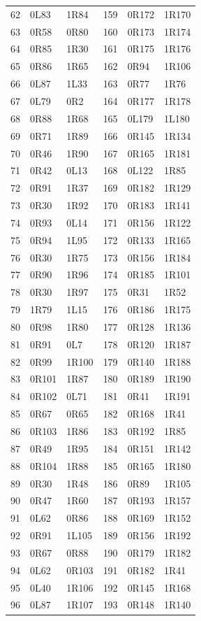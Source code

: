 \begin{longtable}{rll@{\hspace{10mm}}rll}
62 & 0L83 & 1R84 & 159 & 0R172 & 1R170\\
63 & 0R58 & 0R80 & 160 & 0R173 & 1R174\\
64 & 0R85 & 1R30 & 161 & 0R175 & 1R176\\
65 & 0R86 & 1R65 & 162 & 0R94 & 1R106\\
66 & 0L87 & 1L33 & 163 & 0R77 & 1R76\\
67 & 0L79 & 0R2 & 164 & 0R177 & 1R178\\
68 & 0R88 & 1R68 & 165 & 0L179 & 1L180\\
69 & 0R71 & 1R89 & 166 & 0R145 & 1R134\\
70 & 0R46 & 1R90 & 167 & 0R165 & 1R181\\
71 & 0R42 & 0L13 & 168 & 0L122 & 1R85\\
72 & 0R91 & 1R37 & 169 & 0R182 & 1R129\\
73 & 0R30 & 1R92 & 170 & 0R183 & 1R141\\
74 & 0R93 & 0L14 & 171 & 0R156 & 1R122\\
75 & 0R94 & 1L95 & 172 & 0R133 & 1R165\\
76 & 0R30 & 1R75 & 173 & 0R156 & 1R184\\
77 & 0R90 & 1R96 & 174 & 0R185 & 1R101\\
78 & 0R30 & 1R97 & 175 & 0R31 & 1R52\\
79 & 1R79 & 1L15 & 176 & 0R186 & 1R175\\
80 & 0R98 & 1R80 & 177 & 0R128 & 1R136\\
81 & 0R91 & 0L7 & 178 & 0R120 & 1R187\\
82 & 0R99 & 1R100 & 179 & 0R140 & 1R188\\
83 & 0R101 & 1R87 & 180 & 0R189 & 1R190\\
84 & 0R102 & 0L71 & 181 & 0R41 & 1R191\\
85 & 0R67 & 0R65 & 182 & 0R168 & 1R41\\
86 & 0R103 & 1R86 & 183 & 0R192 & 1R85\\
87 & 0R49 & 1R95 & 184 & 0R151 & 1R142\\
88 & 0R104 & 1R88 & 185 & 0R165 & 1R180\\
89 & 0R30 & 1R48 & 186 & 0R89 & 1R105\\
90 & 0R47 & 1R60 & 187 & 0R193 & 1R157\\
91 & 0L62 & 0R86 & 188 & 0R169 & 1R152\\
92 & 0R91 & 1L105 & 189 & 0R156 & 1R192\\
93 & 0R67 & 0R88 & 190 & 0R179 & 1R182\\
94 & 0L62 & 0R103 & 191 & 0R182 & 1R41\\
95 & 0L40 & 1R106 & 192 & 0R145 & 1R168\\
96 & 0L87 & 1R107 & 193 & 0R148 & 1R140\\
\end{longtable}

